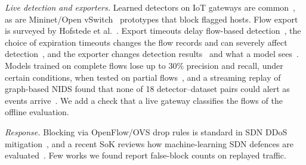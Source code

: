 \emph{Live detection and exporters.} Learned detectors on IoT gateways are common~\cite{realguard2022}, as are Mininet/Open vSwitch~\cite{lantz2010mininet,pfaff2015ovs} prototypes that block flagged hosts. Flow export is surveyed by Hofstede et al.~\cite{hofstede2014flow}. Export timeouts delay flow-based detection~\cite{hofstede2013realtime}, the choice of expiration timeouts changes the flow records and can severely affect detection~\cite{velan2020impact}, and the exporter changes detection results~\cite{pinto2025flowexporter,pinto2025hera} and what a model sees~\cite{vitorino2025revisiting}. Models trained on complete flows lose up to 30\% precision and recall, under certain conditions, when tested on partial flows~\cite{pekar2025early}, and a streaming replay of graph-based NIDS found that none of 18 detector--dataset pairs could alert as events arrive~\cite{zhao2026gidseval}. We add a check that a live gateway classifies the flows of the offline evaluation.

\emph{Response.} Blocking via OpenFlow/OVS drop rules is standard in SDN DDoS mitigation~\cite{bawany2017ddos,yan2016sdn}, and a recent SoK reviews how machine-learning SDN defences are evaluated~\cite{orsdemir2026sok}. Few works we found report false-block counts on replayed traffic.
